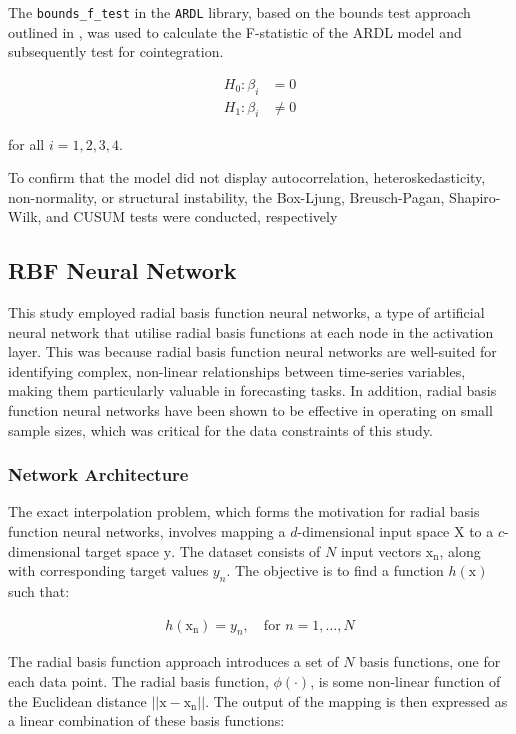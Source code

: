 \documentclass[11pt,a4paper]{article}
\newcommand{\citeboth}[1]{\citeauthor{#1} \citep{#1}}
\begin{document}
The \texttt{{bounds\_f\_test}} in 
the \texttt{ARDL} library, based on the bounds test approach 
outlined in \citeboth{pesaran2001}, was used to calculate the 
F-statistic of the ARDL model and subsequently test for cointegration.

\begin{align*}
    H_{0}: \beta_i &= 0\\
    H_{1}: \beta_i &\neq 0
\end{align*}

for all $i = 1,2,3,4$. 

To confirm that the model did not display autocorrelation, heteroskedasticity, non-normality, or structural instability, the Box-Ljung, Breusch-Pagan, Shapiro-Wilk, and CUSUM tests were conducted, respectively

\subsection{RBF Neural Network}

This study employed radial basis function neural networks, 
a type of artificial neural network that utilise radial basis functions 
at each node in the activation layer. 
This was because radial basis function neural networks 
are well-suited for identifying complex, non-linear relationships 
between time-series variables, making them particularly valuable in 
forecasting tasks. In addition, radial basis function neural networks
have been shown to be effective in operating on small sample sizes, 
which was critical for the data constraints of this study.


\subsubsection{Network Architecture}
The exact interpolation problem, which forms the motivation for radial basis function neural networks, 
involves mapping a $d$-dimensional input space $\boldsymbol{\mathrm{X}}$ to
a $c$-dimensional target space $\boldsymbol{\mathrm{y}}$. The dataset consists of $N$ input
vectors $\boldsymbol{\mathrm{x_n}}$, along with corresponding target 
values $y_n$. The objective is to find a function
  $h(\boldsymbol{\mathrm{x}})$ such that:


\begin{align}
  h(\boldsymbol{\mathrm{x_n}}) = y_n, \quad \text{for } n = 1, \ldots, N
\end{align}

The radial basis function approach 
introduces a set of $N$ basis functions, one for each 
data point. The radial basis function, $\phi(\cdot)$, is some non-linear function of the Euclidean distance
$||\boldsymbol{\mathrm{x}} - \boldsymbol{\mathrm{x_n}}||$. The output of the mapping is then expressed as a linear combination of these basis functions:
\end{document}
